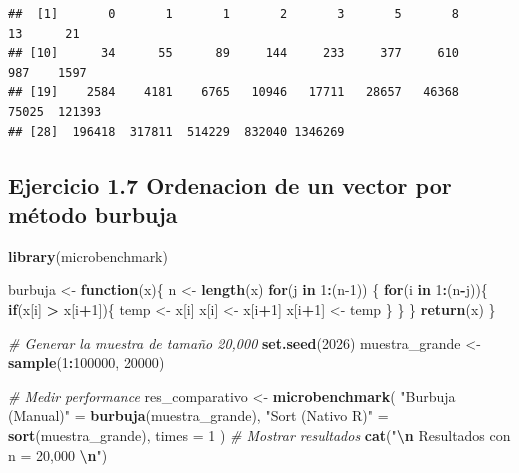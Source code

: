 \documentclass[]{llncs}
\newenvironment{Shaded}{\begin{snugshade}}{\end{snugshade}}
\newcommand{\AttributeTok}[1]{\textcolor[rgb]{0.13,0.29,0.53}{#1}}
\newcommand{\CommentTok}[1]{\textcolor[rgb]{0.56,0.35,0.01}{\textit{#1}}}
\newcommand{\ControlFlowTok}[1]{\textcolor[rgb]{0.13,0.29,0.53}{\textbf{#1}}}
\newcommand{\DecValTok}[1]{\textcolor[rgb]{0.00,0.00,0.81}{#1}}
\newcommand{\FunctionTok}[1]{\textcolor[rgb]{0.13,0.29,0.53}{\textbf{#1}}}
\newcommand{\NormalTok}[1]{#1}
\newcommand{\OtherTok}[1]{\textcolor[rgb]{0.56,0.35,0.01}{#1}}
\newcommand{\SpecialCharTok}[1]{\textcolor[rgb]{0.81,0.36,0.00}{\textbf{#1}}}
\newcommand{\StringTok}[1]{\textcolor[rgb]{0.31,0.60,0.02}{#1}}
\begin{document}
\begin{verbatim}
##  [1]       0       1       1       2       3       5       8      13      21
## [10]      34      55      89     144     233     377     610     987    1597
## [19]    2584    4181    6765   10946   17711   28657   46368   75025  121393
## [28]  196418  317811  514229  832040 1346269
\end{verbatim}

\subsection{Ejercicio 1.7 Ordenacion de un vector por método
burbuja}\label{ejercicio-1.7-ordenacion-de-un-vector-por-muxe9todo-burbuja}

\begin{Shaded}
\begin{Highlighting}[]
\FunctionTok{library}\NormalTok{(microbenchmark)}

\NormalTok{burbuja }\OtherTok{\textless{}{-}} \ControlFlowTok{function}\NormalTok{(x)\{}
\NormalTok{  n }\OtherTok{\textless{}{-}} \FunctionTok{length}\NormalTok{(x)}
  \ControlFlowTok{for}\NormalTok{(j }\ControlFlowTok{in} \DecValTok{1}\SpecialCharTok{:}\NormalTok{(n}\DecValTok{{-}1}\NormalTok{)) \{}
    \ControlFlowTok{for}\NormalTok{(i }\ControlFlowTok{in} \DecValTok{1}\SpecialCharTok{:}\NormalTok{(n}\SpecialCharTok{{-}}\NormalTok{j))\{}
      \ControlFlowTok{if}\NormalTok{(x[i] }\SpecialCharTok{\textgreater{}}\NormalTok{ x[i}\SpecialCharTok{+}\DecValTok{1}\NormalTok{])\{}
\NormalTok{        temp }\OtherTok{\textless{}{-}}\NormalTok{ x[i]}
\NormalTok{        x[i] }\OtherTok{\textless{}{-}}\NormalTok{ x[i}\SpecialCharTok{+}\DecValTok{1}\NormalTok{]}
\NormalTok{        x[i}\SpecialCharTok{+}\DecValTok{1}\NormalTok{] }\OtherTok{\textless{}{-}}\NormalTok{ temp}
\NormalTok{      \}}
\NormalTok{    \}}
\NormalTok{  \}}
  \FunctionTok{return}\NormalTok{(x)}
\NormalTok{\}}

\CommentTok{\# Generar la muestra de tamaño 20,000 }
\FunctionTok{set.seed}\NormalTok{(}\DecValTok{2026}\NormalTok{)}
\NormalTok{muestra\_grande }\OtherTok{\textless{}{-}} \FunctionTok{sample}\NormalTok{(}\DecValTok{1}\SpecialCharTok{:}\DecValTok{100000}\NormalTok{, }\DecValTok{20000}\NormalTok{)}

\CommentTok{\# Medir performance}
\NormalTok{res\_comparativo }\OtherTok{\textless{}{-}} \FunctionTok{microbenchmark}\NormalTok{(}
  \StringTok{"Burbuja (Manual)"} \OtherTok{=} \FunctionTok{burbuja}\NormalTok{(muestra\_grande),}
  \StringTok{"Sort (Nativo R)"} \OtherTok{=} \FunctionTok{sort}\NormalTok{(muestra\_grande),}
  \AttributeTok{times =} \DecValTok{1} 
\NormalTok{)}
\CommentTok{\# Mostrar resultados}
\FunctionTok{cat}\NormalTok{(}\StringTok{"}\SpecialCharTok{\textbackslash{}n}\StringTok{ Resultados con n = 20,000 }\SpecialCharTok{\textbackslash{}n}\StringTok{"}\NormalTok{)}
\end{Highlighting}
\end{Shaded}
\end{document}
